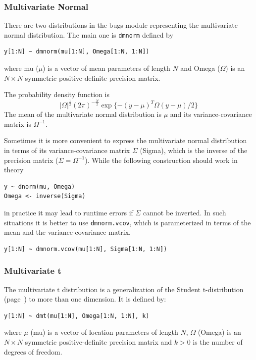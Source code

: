 \documentclass[11pt, a4paper, titlepage]{report}
\begin{document}
{\subsubsection{Multivariate Normal}

There are two distributions in the bugs module representing the
multivariate normal distribution. The main one is \texttt{dmnorm}
defined by
\begin{verbatim}
y[1:N] ~ dmnorm(mu[1:N], Omega[1:N, 1:N])
\end{verbatim}
where mu ($\mu$) is a vector of mean parameters of length $N$ and
Omega ($\Omega$) is an $N \times N$ symmetric positive-definite
precision matrix.

The probability density function is
\[
|\Omega|^{\frac{1}{2}} \left(2\pi\right)^{-\frac{N}{2}}
\exp\{-(y-\mu)^T \Omega (y-\mu) / 2\}
\]
The mean of the multivariate normal distribution is $\mu$ and its
variance-covariance matrix is $\Omega^{-1}$.

Sometimes it is more convenient to express the multivariate normal
distribution in terms of its variance-covariance matrix $\Sigma$ (Sigma),
which is the inverse of the precision matrix ($\Sigma = \Omega^{-1}$).
While the following construction should work in theory
\begin{verbatim}
y ~ dnorm(mu, Omega)
Omega <- inverse(Sigma)
\end{verbatim}
in practice it may lead to runtime errors if $\Sigma$ cannot be inverted.
In such situations it is better to use \texttt{dmnorm.vcov}, which
is parameterized in terms of the mean and the variance-covariance matrix.
\begin{verbatim}
y[1:N] ~ dmnorm.vcov(mu[1:N], Sigma[1:N, 1:N])
\end{verbatim}


\subsubsection{Multivariate t}

The multivariate t distribution is a generalization of the Student
t-distribution (page~\pageref{bugs:dt}) to more than one dimension. It
is defined by:
\begin{verbatim}
y[1:N] ~ dmt(mu[1:N], Omega[1:N, 1:N], k)
\end{verbatim}
where $\mu$ (mu) is a vector of location parameters of length $N$,
$\Omega$ (Omega) is an $N \times N$ symmetric positive-definite
precision matrix and $k > 0$ is the number of degrees of freedom.

}
\end{document}
